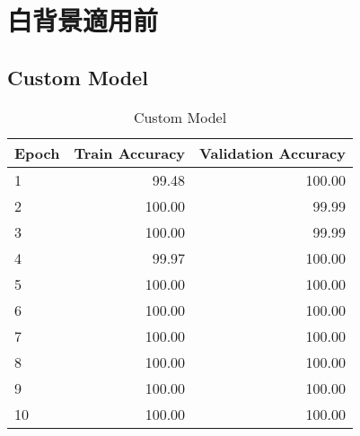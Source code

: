 \documentclass[a4paper,11pt,titlepage]{jsarticle}
\begin{document}
\section{白背景適用前}
\subsection{Custom Model}

\begin{table}[H]
\centering
\caption{Custom Model}
\label{tab:Custom}
\begin{tabular}{lrr}
\hline
 Epoch &  Train Accuracy &  Validation Accuracy \\
\hline
     1 &           99.48 &               100.00 \\
     2 &          100.00 &                99.99 \\
     3 &          100.00 &                99.99 \\
     4 &           99.97 &               100.00 \\
     5 &          100.00 &               100.00 \\
     6 &          100.00 &               100.00 \\
     7 &          100.00 &               100.00 \\
     8 &          100.00 &               100.00 \\
     9 &          100.00 &               100.00 \\
    10 &          100.00 &               100.00 \\
\hline
\end{tabular}
\end{table}
\end{document}

